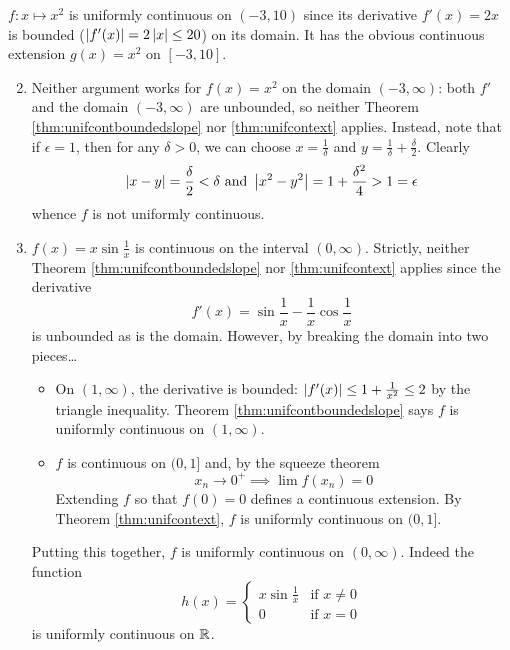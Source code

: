 \begin{examples}{}{}
\exstart $f:x\mapsto x^2$ is uniformly continuous on $(-3,10)$ since its derivative $f'(x)=2x$ is bounded ($\left| f'(x)\right|=2\left| x\right|\le 20$) on its domain. It has the obvious continuous extension $g(x)=x^2$ on $[-3,10]$.
\begin{enumerate}\setcounter{enumi}{1}
	\item	Neither argument works for $f(x)=x^2$ on the domain $(-3,\infty)$: both $f'$ and the domain $(-3,\infty)$ are unbounded, so neither Theorem \ref{thm:unifcontboundedslope} nor \ref{thm:unifcontext} applies.\smallbreak
	Instead, note that if $\epsilon=1$, then for any $\delta>0$, we can choose $x=\frac 1\delta$ and $y=\frac 1\delta+\frac\delta 2$. Clearly
	\[\left| x-y\right|=\frac\delta 2<\delta\text{ and }\left| x^2-y^2\right|=1+\frac{\delta^2}4>1=\epsilon\]
	whence $f$ is not uniformly continuous.\smallbreak
	\item $f(x)=x\sin \frac 1x$ is continuous on the interval $(0,\infty)$. Strictly, neither Theorem \ref{thm:unifcontboundedslope} nor \ref{thm:unifcontext} applies since the derivative
	\[f'(x)=\sin\frac 1x-\frac 1x\cos\frac 1x\]
	is unbounded as is the domain. However, by breaking the domain into two pieces\ldots 
	\begin{itemize}
	  \item On $(1,\infty)$, the derivative is bounded: $\left| f'(x)\right|\le 1+\frac 1{x^2}\le 2$ by the triangle inequality. Theorem \ref{thm:unifcontboundedslope} says $f$ is uniformly continuous on $(1,\infty)$.
	  \item $f$ is continuous on $(0,1]$ and, by the squeeze theorem
	  \[x_n\to 0^+\implies \lim f(x_n)=0\]
	  Extending $f$ so that $f(0)=0$ defines a continuous extension. By Theorem \ref{thm:unifcontext}, $f$ is uniformly continuous on $(0,1]$.
 	\end{itemize}
 	Putting this together, $f$ is uniformly continuous on $(0,\infty)$. Indeed the function
 	\[h(x)=\begin{cases}
 	x\sin\frac 1x&\text{if }x\neq 0\\
 	0&\text{if }x=0
 	\end{cases}\]
 	is uniformly continuous on $\mathbb{R}$.
\end{enumerate}
\end{examples}




